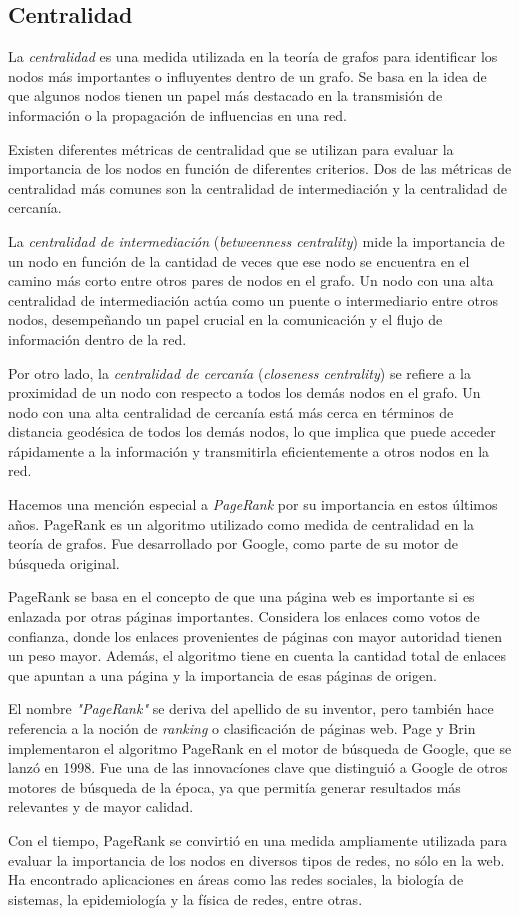 \subsection{Centralidad}

La \textit{centralidad} es una medida utilizada en la teoría de grafos para identificar los nodos
más importantes o influyentes dentro de un grafo. Se basa en la idea de que algunos nodos tienen un
papel más destacado en la transmisión de información o la propagación de influencias en una red.

Existen diferentes métricas de centralidad que se utilizan para evaluar la importancia de los
nodos en función de diferentes criterios. Dos de las métricas de centralidad más comunes son la
centralidad de intermediación y la centralidad de cercanía.

La \textit{centralidad de intermediación} (\textit{betweenness centrality}) mide la importancia de
un nodo en función de la cantidad de veces que ese nodo se encuentra en el camino más corto entre
otros pares de nodos en el grafo. Un nodo con una alta centralidad de intermediación actúa como un
puente o intermediario entre otros nodos, desempeñando un papel crucial en la comunicación y el
flujo de información dentro de la red.

Por otro lado, la \textit{centralidad de cercanía} (\textit{closeness centrality}) se refiere a la
proximidad de un nodo con respecto a todos los demás nodos en el grafo. Un nodo con una alta
centralidad de cercanía está más cerca en términos de distancia geodésica de todos los demás nodos,
lo que implica que puede acceder rápidamente a la información y transmitirla eficientemente a otros
nodos en la red.

Hacemos una mención especial a \textit{PageRank} por su importancia en estos últimos años. PageRank es un algoritmo utilizado como medida de
centralidad en la teoría de grafos. Fue desarrollado por Google, como parte de su motor de búsqueda
original.

PageRank se basa en el concepto de que una página web es importante si es enlazada por otras
páginas importantes. Considera los enlaces como votos de confianza, donde los enlaces provenientes
de páginas con mayor autoridad tienen un peso mayor. Además, el algoritmo tiene en cuenta la
cantidad total de enlaces que apuntan a una página y la importancia de esas páginas de origen.

El nombre \textit{"PageRank"} se deriva del apellido de su inventor, pero también hace referencia
a la noción de \textit{ranking} o clasificación de páginas web. Page y Brin implementaron el
algoritmo PageRank en el motor de búsqueda de Google, que se lanzó en 1998. Fue una de
las innovacíones clave que distinguió a Google de otros motores de búsqueda de la época, ya que
permitía generar resultados más relevantes y de mayor calidad\cite{Pageetal98}.

Con el tiempo, PageRank se convirtió en una medida ampliamente utilizada para evaluar la importancia
de los nodos en diversos tipos de redes, no sólo en la web. Ha encontrado aplicaciones en áreas como
las redes sociales, la biología de sistemas, la epidemiología y la física de redes, entre otras.

